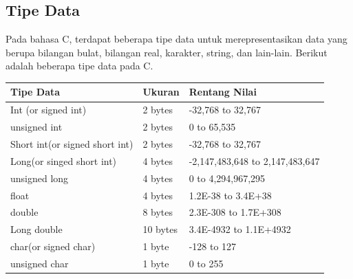 \subsection{Tipe Data}
Pada bahasa C, terdapat beberapa tipe data untuk merepresentasikan data yang berupa bilangan bulat, bilangan real, karakter, string, dan lain-lain. Berikut adalah beberapa tipe data pada C.
\begin{center}
	\begin{tabular}{|l|l|l|}
		\hline
		\textbf{Tipe Data}             & \textbf{Ukuran}   &  \textbf{Rentang Nilai}         \\ \hline
		Int (or signed int)            & 2 bytes  		   & -32,768 to 32,767               \\ \hline
		unsigned int                   & 2 bytes  		   & 0 to 65,535                     \\ \hline
		Short int(or signed short int) & 2 bytes  		   & -32,768 to 32,767               \\ \hline
		Long(or singed short int)      & 4 bytes  		   & -2,147,483,648 to 2,147,483,647 \\ \hline
		unsigned long                  & 4 bytes  		   & 0 to 4,294,967,295              \\ \hline
		float                          & 4 bytes  		   & 1.2E-38 to 3.4E+38              \\ \hline
		double                         & 8 bytes  		   & 2.3E-308 to 1.7E+308            \\ \hline
		Long double                    & 10 bytes 		   & 3.4E-4932 to 1.1E+4932          \\ \hline
		char(or signed char)           & 1 byte  		   & -128 to 127                     \\ \hline
		unsigned char                  & 1 byte  		   & 0 to 255                        \\ \hline
	\end{tabular}
\end{center}
